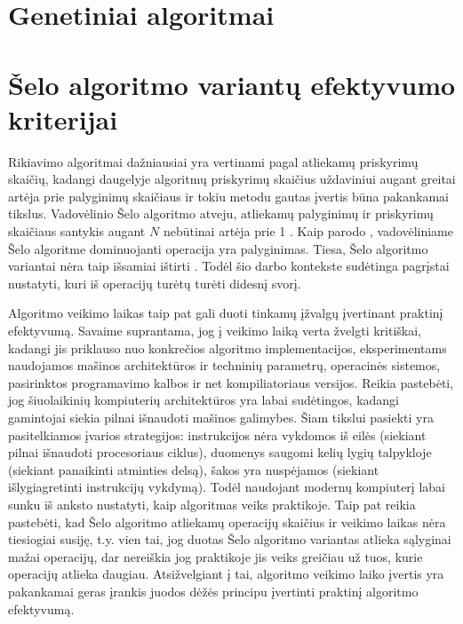 \documentclass{VUMIFInfKursinis}
\begin{document}
\section{Genetiniai algoritmai}


\section{Šelo algoritmo variantų efektyvumo kriterijai}

Rikiavimo algoritmai dažniausiai yra vertinami pagal atliekamų priskyrimų skaičių, kadangi
daugelyje algoritmų priskyrimų skaičius uždaviniui augant greitai artėja prie palyginimų skaičiaus ir
tokiu metodu gautas įvertis būna pakankamai tikslus.
Vadovėlinio Šelo algoritmo atveju, atliekamų palyginimų ir priskyrimų skaičiaus santykis augant $N$ nebūtinai artėja prie 1 \cite{Radavičius_Baranauskas_2013}.
Kaip parodo \cite{ciura2001best}, vadovėliniame Šelo algoritme dominuojanti operacija yra palyginimas.
Tiesa, Šelo algoritmo variantai nėra taip išsamiai ištirti \cite{brejova2001analyzing}.
Todėl šio darbo kontekste sudėtinga pagrįstai nustatyti, kuri iš operacijų turėtų turėti didesnį svorį.

Algoritmo veikimo laikas taip pat gali duoti tinkamų įžvalgų įvertinant praktinį efektyvumą.
Savaime suprantama, jog į veikimo laiką verta žvelgti kritiškai, kadangi jis priklauso nuo konkrečios algoritmo implementacijos,
eksperimentams naudojamos mašinos architektūros ir techninių parametrų, operacinės sistemos, pasirinktos programavimo kalbos ir net kompiliatoriaus versijos.
Reikia pastebėti, jog šiuolaikinių kompiuterių architektūros yra labai sudėtingos, kadangi gamintojai siekia pilnai išnaudoti mašinos galimybes.
Šiam tikslui pasiekti yra pasitelkiamos įvarios strategijos:
instrukcijos nėra vykdomos iš eilės (siekiant pilnai išnaudoti procesoriaus ciklus),
duomenys saugomi kelių lygių talpykloje (siekiant panaikinti atminties delsą),
šakos yra nuspėjamos (siekiant išlygiagretinti instrukcijų vykdymą).
Todėl naudojant modernų kompiuterį labai sunku iš anksto nustatyti, kaip algoritmas veiks praktikoje. 
Taip pat reikia pastebėti, kad Šelo algoritmo atliekamų operacijų skaičius ir veikimo laikas nėra tiesiogiai susiję, t.y.
vien tai, jog duotas Šelo algoritmo variantas atlieka sąlyginai mažai operacijų, dar nereiškia jog praktikoje jis veiks greičiau
už tuos, kurie operacijų atlieka daugiau. %
Atsižvelgiant į tai, algoritmo veikimo laiko įvertis yra pakankamai geras įrankis juodos dėžės principu įvertinti praktinį algoritmo efektyvumą.
\end{document}
